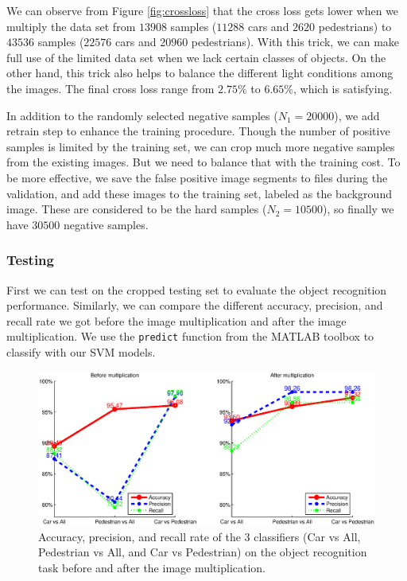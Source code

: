 \documentclass{article} %
\begin{document}
We can observe from Figure \ref{fig:crossloss} that the cross loss gets lower when we multiply the data set from $13908$ samples ($11288$ cars and $2620$ pedestrians) to $43536$ samples ($22576$ cars and $20960$ pedestrians). With this trick, we can make full use of the limited data set when we lack certain classes of objects. On the other hand, this trick also helps to balance the different light conditions among the images. The final cross loss range from $2.75\%$ to $6.65\%$, which is satisfying. 

In addition to the randomly selected negative samples ($N_1=20000$), we add retrain step to enhance the training procedure. Though the number of positive samples is limited by the training set, we can crop much more negative samples from the existing images. But we need to balance that with the training cost. To be more effective, we save the false positive image segments to files during the validation, and add these images to the training set, labeled as the background image. These are considered to be the hard samples ($N_2=10500$), so finally we have $30500$ negative samples.


\subsubsection{Testing}
\label{sec:test}

First we can test on the cropped testing set to evaluate the object recognition performance. Similarly, we can compare the different accuracy, precision, and recall rate we got before the image multiplication and after the image multiplication. We use the \texttt{predict} function from the MATLAB toolbox to classify with our SVM models.


\begin{figure}[htb]
\begin{center}
\includegraphics[width=.9\textwidth]{test_apr.eps}
\end{center}
\caption{Accuracy, precision, and recall rate of the 3 classifiers (Car vs All, Pedestrian vs All, and Car vs Pedestrian) on the object recognition task before and after the image multiplication.
\label{fig:test-apr}}
\end{figure}
\end{document}
